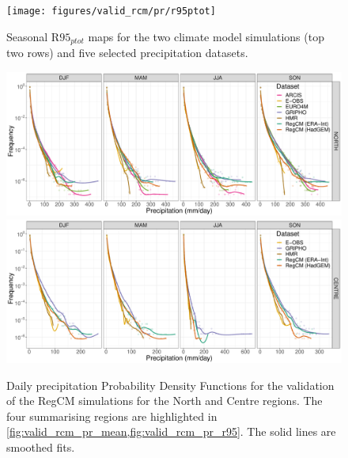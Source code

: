 \begin{figure}
    \centering
    \texttt{[image: figures/valid\_rcm/pr/r95ptot]}
    \decoRule
    \caption[Validation of extreme events ($\textrm{R95}_{ptot}$)]{
        Seasonal $\textrm{R95}_{ptot}$ maps for the two climate model simulations (top two rows) and five selected precipitation datasets.
    } \label{fig:valid_rcm_pr_r95}
\end{figure}
\begin{figure}
    \centering
        \includegraphics[width=0.8\textheight]{figures/valid_rcm/pr/pdf_NORTH_lines}
        \includegraphics[width=0.8\textheight]{figures/valid_rcm/pr/pdf_CENTRE_lines}
    \caption[Validation of RegCM precipitation PDFs (1)]{
        Daily precipitation Probability Density Functions for the validation of the RegCM simulations for the North and Centre regions. The four summarising regions are highlighted in \cref{fig:valid_rcm_pr_mean,fig:valid_rcm_pr_r95}. The solid lines are smoothed fits.
    }\label{fig:valid_rcm_pr_pdf1}
\end{figure}
